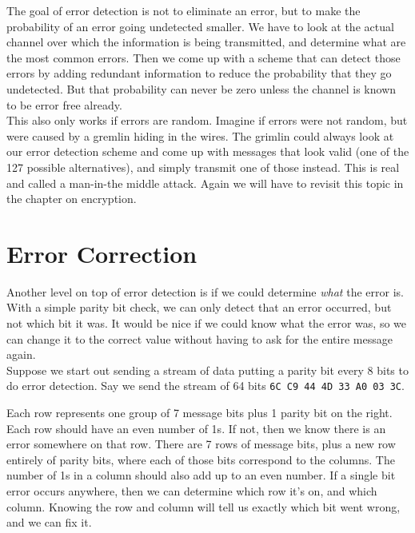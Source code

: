 The goal of error detection is not to eliminate an error, but to make the probability of an error going undetected smaller. We have to look at the actual channel over which the information is being transmitted, and determine what are the most common errors. Then we come up with a scheme that can detect those errors by adding redundant information to reduce the probability that they go undetected. But that probability can never be zero unless the channel is known to be error free already.\\

This also only works if errors are random. Imagine if errors were not random, but were caused by a gremlin hiding in the wires. The grimlin could always look at our error detection scheme and come up with messages that look valid (one of the 127 possible alternatives), and simply transmit one of those instead. This is real and called a man-in-the middle attack. Again we will have to revisit this topic in the chapter on encryption.

\section{Error Correction}


Another level on top of error detection is if we could determine \textit{what} the error is. With a simple parity bit check, we can only detect that an error occurred, but not which bit it was. It would be nice if we could know what the error was, so we can change it to the correct value without having to ask for the entire message again.\\

Suppose we start out sending a stream of data putting a parity bit every 8 bits to do error detection. Say we send the stream of 64 bits \texttt{6C C9 44 4D 33 A0 03 3C}.\\

\begin{center}\end{center}

Each row represents one group of 7 message bits plus 1 parity bit on the right. Each row should have an even number of 1s. If not, then we know there is an error somewhere on that row. There are 7 rows of message bits, plus a new row entirely of parity bits, where each of those bits correspond to the columns. The number of 1s in a column should also add up to an even number. If a single bit error occurs anywhere, then we can determine which row it's on, and which column. Knowing the row and column will tell us exactly which bit went wrong, and we can fix it.\\

